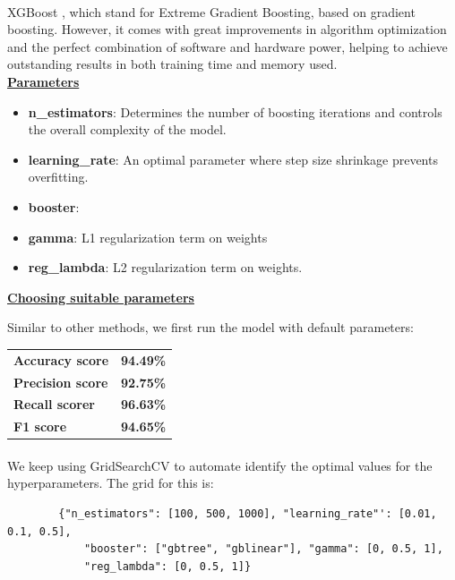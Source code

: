 \documentclass[a4paper]{report}
\begin{document}
	\paragraph{}
	XGBoost \cite{XGBoost}, which stand for Extreme Gradient Boosting, based on gradient boosting. However, it comes with great improvements in algorithm optimization and the perfect combination of software and hardware power, helping to achieve outstanding results in both training time and memory used. \\
	
	\underline{\textbf{\Large{Parameters}}}
	
	\begin{itemize}
		\item \textbf{n\_estimators}: Determines the number of boosting iterations and controls the overall complexity of the model.
		\item \textbf{learning\_rate}: An optimal parameter where step size shrinkage prevents overfitting.
		\item \textbf{booster}: 
		\item \textbf{gamma}: L1 regularization term on weights
		\item \textbf{reg\_lambda}: L2 regularization term on weights.
	\end{itemize}
	
	\underline{\textbf{\Large Choosing suitable parameters}}
	
	Similar to other methods, we first run the model with default parameters:
	
	\begin{center}
		\begin{tabular}{ll}
			\toprule
			\textbf{Accuracy score} & \textbf{94.49\%} \\
			\textbf{Precision score}  & \textbf{92.75\%} \\
			\textbf{Recall scorer}     & \textbf{96.63\%} \\
			\textbf{F1 score}   & \textbf{94.65\%} \\
			\bottomrule
		\end{tabular}
	\end{center}
	
	\paragraph{}
	We keep using GridSearchCV to automate identify the optimal values for the hyperparameters. The grid for this is: 
	\begin{verbatim}
		{"n_estimators": [100, 500, 1000], "learning_rate"': [0.01, 0.1, 0.5],
			"booster": ["gbtree", "gblinear"], "gamma": [0, 0.5, 1], 
			"reg_lambda": [0, 0.5, 1]}
	\end{verbatim}
\end{document}
